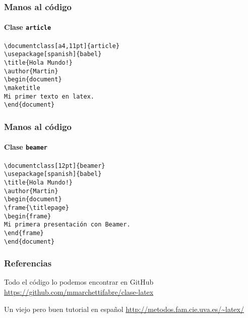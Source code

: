 \documentclass[12pt]{beamer}
\begin{document}
\begin{frame}%
  \frametitle{Manos al código}
  \framesubtitle{Clase \texttt{article}}
  \begin{block}{}
    \texttt{\textbackslash documentclass[a4,11pt]\{article\}\\
      \textbackslash usepackage[spanish]\{babel\}\\
      \bigskip
      \textbackslash title\{Hola Mundo!\}\\
      \textbackslash author\{Martin\}\\
      \bigskip
      \textbackslash begin\{document\}\\
      \textbackslash maketitle\\
      \bigskip
      Mi primer texto en latex.\\
      \bigskip
      \textbackslash end\{document\}
    }
\end{block}
\end{frame}

\begin{frame}%
  \frametitle{Manos al código}
  \framesubtitle{Clase \texttt{beamer}}
  \begin{block}{}
    \texttt{\textbackslash documentclass[12pt]\{beamer\}\\
      \textbackslash usepackage[spanish]\{babel\}\\
      \bigskip
      \textbackslash title\{Hola Mundo!\}\\
      \textbackslash author\{Martin\}\\
      \bigskip
      \textbackslash begin\{document\}\\
      \textbackslash frame\{\textbackslash titlepage\}\\
      \bigskip
      \textbackslash begin\{frame\}\\
      Mi primera presentación con Beamer.\\
      \textbackslash end\{frame\}\\
      \bigskip
      \textbackslash end\{document\}
    }
\end{block}
\end{frame}

\begin{frame}%
  \frametitle{Referencias}
  \begin{block}{Todo el código lo podemos encontrar en GitHub}
    \url{https://github.com/mmarchettifabre/clase-latex}
  \end{block}
  \begin{block}{Un viejo pero buen tutorial en español}
    \url{http://metodos.fam.cie.uva.es/~latex/}
  \end{block}
\end{frame}
\end{document}
